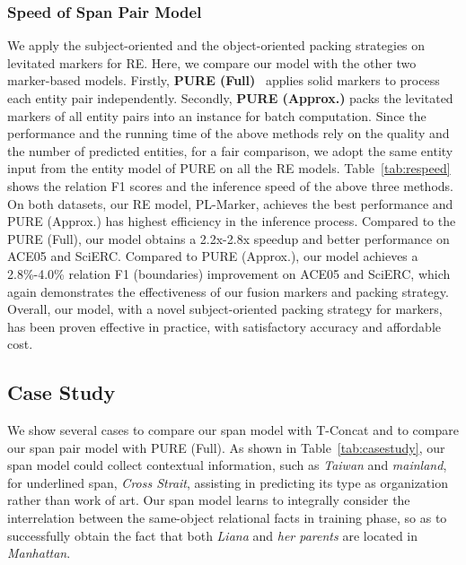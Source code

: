\documentclass[11pt]{article}
\newcommand\Ourmodel{PL-Marker\xspace}
\begin{document}
\subsubsection{Speed of Span Pair Model}
\label{sec:compare_pure}

We apply the subject-oriented and the object-oriented  packing strategies on levitated markers for RE. Here, we compare our model with the other two marker-based models. Firstly, \textbf{PURE (Full)}~\cite{PURE} applies solid markers to  process each entity pair independently. Secondly,  \textbf{PURE (Approx.)}  packs the levitated  markers of all entity pairs into an instance for  batch computation. Since the performance and the running time of the above methods rely on the quality and the number of predicted entities, for a fair comparison, we adopt the same entity input from the entity model of PURE on all the RE models. 
Table~\ref{tab:respeed} shows the relation F1 scores and the inference speed of the above three methods. On both datasets,  our RE model, \Ourmodel, achieves the best performance and PURE (Approx.)  has highest efficiency in the inference process.  Compared to the PURE (Full), our model obtains a 2.2x-2.8x speedup and better performance on ACE05 and SciERC. 
Compared to PURE (Approx.), our model achieves a  2.8\%-4.0\%  relation F1 (boundaries) improvement on ACE05 and SciERC,  which again demonstrates the effectiveness of our fusion markers and packing strategy. 
Overall, our model, with a novel subject-oriented packing strategy for markers, has been proven effective in practice, with satisfactory accuracy and affordable cost.




\subsection{Case Study}


We show several cases to compare our span model with T-Concat and to compare our span pair model with PURE (Full). As shown in Table~\ref{tab:casestudy}, our span model could collect contextual information, such as \emph{Taiwan} and \emph{mainland}, for underlined span, \emph{Cross Strait}, assisting in predicting its type as organization rather than work of art.  
Our span model learns to integrally consider the interrelation between the same-object relational facts in  training phase, so as to successfully obtain the fact that both \emph{Liana} and \emph{her parents} are located in \emph{Manhattan}.
\end{document}
